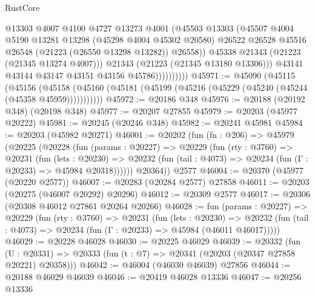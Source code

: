 \begin{lexlean}{RustCore}
\begin{coremodule}
                            @13303
                            @4007
                            @4100
                            @4727
                            @13273
                            @4001
                            (@45503
                              @13303
                              (@45507
                                @4004
                                @5190
                                @13281
                                @13298
                                (@45298 @4004 @45302 @20580)
                                @26522
                                @26528
                                @45516
                                @26548
                                (@21223 (@26550 @13298 @13282))
                                @26558))
                            @45338
                            @21343
                            (@21223 (@21345 @13274 @4007)))
                          @21343
                          (@21223 (@21345 @13180 @13306)))
                        @43141
                        @43144
                        @43147
                        @43151
                        @43156
                        @45786))))))))))
@45971 := @45090
    (@45115
      (@45156
        (@45158 (@45160 (@45181 (@45199 (@45216 (@45229 (@45240 (@45244 (@45358 @45959)))))))))))
@45972 := @20186 @348
@45976 := @20188 (@20192 @348) (@20198 @348)
@45977 := @20207 @27855
@45979 := @20203 (@45977 @20222)
@45981 := @20245 (@20246 @348)
@45982 := @20241 @45981
@45984 := @20203 (@45982 @20271)
@46001 := @20202
    (fun (fn : @206) =>
    @45979
      (@20225
        (@20228
          (fun (params : @20227) =>
          @20229
            (fun (rty : @3760) =>
            @20231
              (fun (lets : @20230) =>
              @20232 (fun (tail : @4073) => @20234 (fun (Γ : @20233) => @45984 @20318))))))
        @20364))
    @2577
@46004 := @20370 (@45977 (@20220 @2577))
@46007 := @20283 (@20284 @2577) @27858
@46011 := @20203 (@20275 (@46007 @20292) @20296)
@46012 := @20309 @2577
@46017 := @20306 (@20308 @46012 @27861 @20264 @20266)
@46028 := fun (params : @20227) =>
  @20229
    (fun (rty : @3760) =>
    @20231
      (fun (lets : @20230) =>
      @20232 (fun (tail : @4073) => @20234 (fun (Γ : @20233) => @45984 (@46011 @46017)))))
@46029 := @20228 @46028
@46030 := @20225 @46029
@46039 := @20332
    (fun (U : @20331) => @20333 (fun (t : @7) => @20341 (@20203 (@20347 @27858 @20221) @20358)))
@46042 := @46004 (@46030 @46039) @27856
@46044 := @20188 @46029 @46039
@46046 := @20419 @46028 @13336
@46047 := @20256 @13336

\end{coremodule}
\end{lexlean}

